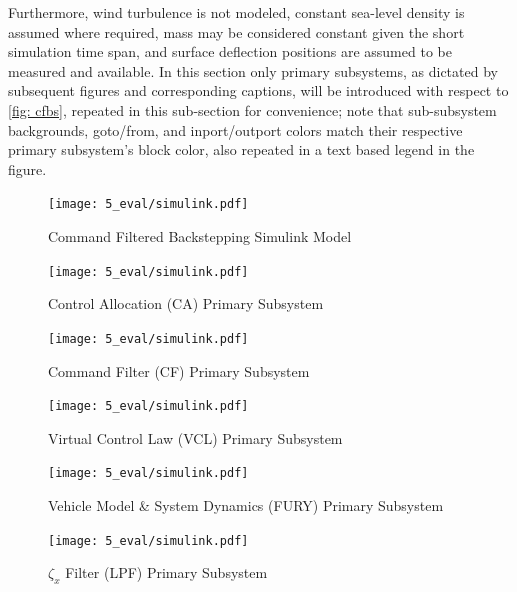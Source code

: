 \documentclass[12pt]{ucthesis}
\begin{document}
Furthermore, wind turbulence is not modeled, constant sea-level density is assumed where required, mass may be considered constant given the short simulation time span, and surface deflection positions are assumed to be measured and available. In this section only primary subsystems, as dictated by subsequent figures and corresponding captions, will be introduced with respect to \autoref{fig: cfbs}, repeated in this sub-section for convenience; note that sub-subsystem backgrounds, goto/from, and inport/outport colors match their respective primary subsystem's block color, also repeated in a text based legend in the figure.
%
\begin{figure} %
	\centering
	\texttt{[image: 5\_eval/simulink.pdf]}%
	\renewcommand\thefigure{\ref{fig: cfbs}}
	\caption{Command Filtered Backstepping Simulink Model}
\end{figure}
\addtocounter{figure}{-1} %
%
\begin{figure}
	\centering
	\texttt{[image: 5\_eval/simulink.pdf]}%
	\caption{Control Allocation (CA) Primary Subsystem}
	\label{fig: cfbs_CA}
\end{figure}
%
\begin{figure}
	\centering
	\texttt{[image: 5\_eval/simulink.pdf]}%
	\caption{Command Filter (CF) Primary Subsystem}
	\label{fig: cfbs_CF}
\end{figure}
%
\begin{figure}[ht]
	\vspace{-4em}
	\begin{adjustwidth}{-1in}{-1in}%
		\centering
		\texttt{[image: 5\_eval/simulink.pdf]}%
	\end{adjustwidth}
	\vspace{-2em}
	\caption{Virtual Control Law (VCL) Primary Subsystem}
	\label{fig: cfbs_VCL}
\vspace{1em}
	\begin{adjustwidth}{-1in}{-1in}%
		\centering
		\texttt{[image: 5\_eval/simulink.pdf]}%
	\end{adjustwidth}
	\vspace{-2em}
	\caption{Vehicle Model \& System Dynamics (FURY) Primary Subsystem}
	\label{fig: cfbs_fury}
\vspace{1em}
	\begin{adjustwidth}{-1in}{-1in}%
		\centering
		\texttt{[image: 5\_eval/simulink.pdf]}%
	\end{adjustwidth}
	\vspace{-2em}
	\caption{$\zeta_x$ Filter (LPF) Primary Subsystem}
	\label{fig: cfbs_zeta}
\end{figure}
%
\clearpage %
%
\end{document}
